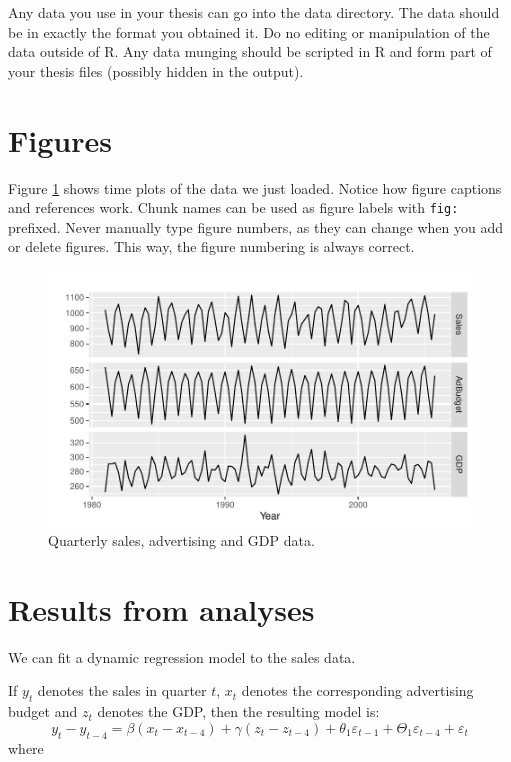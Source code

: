 \documentclass{sydneythesis}
\begin{document}
Any data you use in your thesis can go into the data directory. The data should be in exactly the format you obtained it. Do no editing or manipulation of the data outside of R. Any data munging should be scripted in R and form part of your thesis files (possibly hidden in the output).

\hypertarget{figures}{%
\section{Figures}\label{figures}}

Figure \ref{fig:deaths} shows time plots of the data we just loaded. Notice how figure captions and references work. Chunk names can be used as figure labels with \texttt{fig:} prefixed. Never manually type figure numbers, as they can change when you add or delete figures. This way, the figure numbering is always correct.

\begin{figure}
\centering
\includegraphics{thesis_files/figure-latex/deaths-1.pdf}
\caption{\label{fig:deaths}Quarterly sales, advertising and GDP data.}
\end{figure}

\hypertarget{results-from-analyses}{%
\section{Results from analyses}\label{results-from-analyses}}

We can fit a dynamic regression model to the sales data.

If \(y_t\) denotes the sales in quarter \(t\), \(x_t\) denotes the corresponding advertising budget and \(z_t\) denotes the GDP, then the resulting model is:
\begin{equation}
  y_t - y_{t-4} = \beta (x_t-x_{t-4}) + \gamma (z_t-z_{t-4}) + \theta_1 \varepsilon_{t-1} + \Theta_1 \varepsilon_{t-4} + \varepsilon_t
\end{equation}
where
\end{document}
